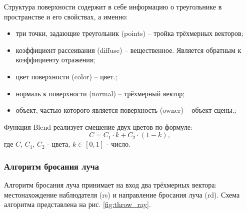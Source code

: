 \documentclass[a4paper, 14pt]{report} %
\begin{document}
	Структура поверхности содержит в себе информацию о треугольнике в пространстве и его свойствах, а именно:
	\begin{itemize}
		\item три точки, задающие треугольник (points) – тройка трёхмерных векторов;
		\item коэффициент рассеивания (diffuse) – вещественное. Является обратным к коэффициенту отражения;
		\item цвет поверхности (color) – цвет.;
		\item нормаль к поверхности (normal) – трёхмерный вектор;
		\item объект, частью которого является поверхность (owner) – объект сцены.;
	\end{itemize}
	
	Функция Blend реализует смешение двух цветов по формуле:
	\begin{equation}
		C = C_1\cdot k+C_2\cdot(1-k),
	\end{equation}
	где $C$, $C_1$, $C_2$ - цвета, $k\in[0, 1]$ - число.

	\subsubsection{Алгоритм бросания луча}
	Алгоритм бросания луча принимает на вход два трёхмерных вектора: местонахождение наблюдателя (rs) и направление бросания луча (rd). Схема алгоритма представлена на рис. \ref{fig:throw_ray}.
	
\end{document}
